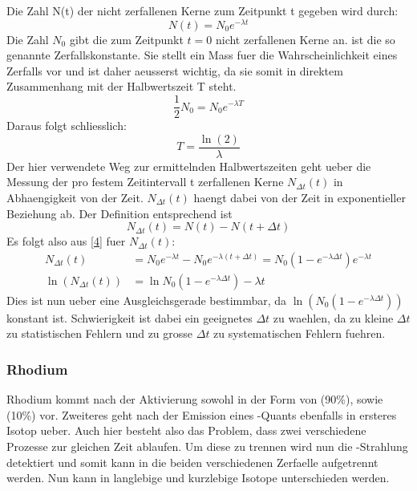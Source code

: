 \documentclass[titlepage=firstcover, captions=tableheading]{scrartcl}
\let\ce\ch
\begin{document}
Die Zahl N(t) der nicht zerfallenen Kerne zum Zeitpunkt t gegeben wird durch:
\begin{equation}
    N(t)=N_0e^{-\lambda t} \label{4}
\end{equation}
Die Zahl $N_0$ gibt die zum Zeitpunkt $t=0$ nicht zerfallenen Kerne an. \lambda ist die so genannte Zerfallskonstante. Sie stellt ein Mass fuer die Wahrscheinlichkeit eines Zerfalls vor und ist daher aeusserst wichtig, da sie somit in direktem Zusammenhang mit der Halbwertszeit T steht. 
\begin{equation}
    \frac{1}{2}N_0=N_0e^{-\lambda T}\nonumber
\end{equation}
Daraus folgt schliesslich:
\begin{equation}
    T=\frac{\ln(2)}{\lambda} \nonumber
\end{equation}
Der hier verwendete Weg zur ermittelnden Halbwertszeiten geht ueber die Messung der pro festem Zeitintervall \Delta t  zerfallenen Kerne $N_{\Delta t}(t)$ in Abhaengigkeit von der Zeit. $N_{\Delta t}(t)$ haengt dabei von der Zeit in exponentieller Beziehung ab. Der Definition entsprechend ist 
\begin{equation}
    N_{\Delta t}(t) = N(t) - N(t+\Delta t)
\end{equation}
Es folgt also aus \ref{4} fuer $N_{\Delta t}(t)$:
\begin{align}
    N_{\Delta t}(t)&=N_0e^{-\lambda t}-N_0e^{-\lambda(t+\Delta t)}=N_0(1-e^{-\lambda\Delta t})e^{-\lambda t} \nonumber \\
    \ln(N_{\Delta t}(t))&=\ln N_0(1-e^{-\lambda\Delta t})-\lambda t \nonumber
\end{align}
Dies ist nun ueber eine Ausgleichsgerade bestimmbar, da $\ln(N_0(1-e^{-\lambda\Delta t}))$ konstant ist. Schwierigkeit ist dabei ein geeignetes $\Delta t$ zu waehlen, da zu kleine $\Delta t$ zu statistischen Fehlern und zu grosse $\Delta t$ zu systematischen Fehlern fuehren.
\subsubsection{Rhodium}
Rhodium kommt nach der Aktivierung sowohl in der Form von \ce{^{104}Rh} (90\%), sowie \ce{^{104i}Rh} (10\%) vor. Zweiteres geht nach der Emission eines \gamma-Quants ebenfalls in ersteres Isotop ueber. Auch hier besteht also das Problem, dass zwei verschiedene Prozesse zur gleichen Zeit ablaufen. Um diese zu trennen wird nun die \gamma-Strahlung detektiert und somit kann in die beiden verschiedenen Zerfaelle aufgetrennt werden. Nun kann in langlebige und kurzlebige Isotope unterschieden werden.
\end{document}
